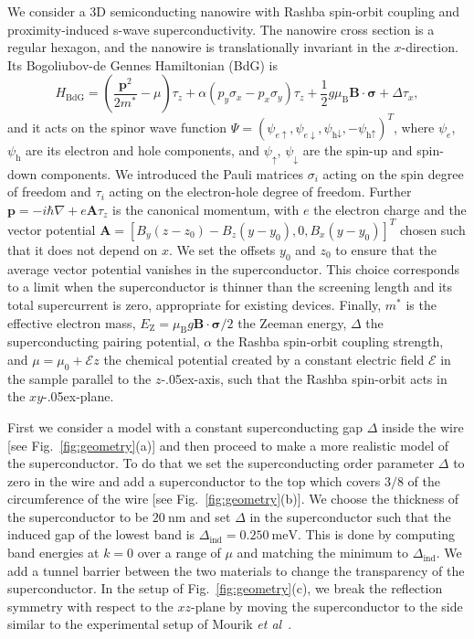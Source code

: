 We consider a 3D semiconducting nanowire with Rashba spin-orbit coupling and proximity-induced s-wave superconductivity.
The nanowire cross section is a regular hexagon, and the nanowire is translationally invariant in the $x$-direction.
Its Bogoliubov-de Gennes Hamiltonian (BdG) is
\begin{equation}
H_\textrm{BdG} = \left(\frac{\mathbf{p}^{2}}{2m^*}-\mu\right)\tau_z+\alpha\left(p_{y}\sigma_x -p_{x}\sigma_y \right)\tau_z + \frac{1}{2}g\mu_\textrm{B}\mathbf{B}\cdot\boldsymbol{\sigma}+\Delta\tau_x,\label{eq:H_BdG}
\end{equation}
and it acts on the spinor wave function $\Psi={\left(\psi_{e\uparrow},\psi_{e\downarrow},\psi_{\textrm{h}\downarrow},-\psi_{\textrm{h}\uparrow}\right)}^{T}$, where $\psi_e$, $\psi_\textrm{h}$ are its electron and hole components, and $\psi_\uparrow$, $\psi_\downarrow$ are the spin-up and spin-down components.
We introduced the Pauli matrices $\sigma_{i}$ acting on the spin degree of freedom and $\tau_{i}$ acting on the electron-hole degree of freedom.
Further $\mathbf{p}=-i\hbar\nabla+e\mathbf{A}\tau_z$ is the canonical momentum, with $e$ the electron charge and the vector potential $\mathbf{A}={\left[ B_y (z - z_0) - B_z (y - y_0), 0, B_x (y - y_0)\right]}^{T}$ chosen such that it does not depend on $x$.
We set the offsets $y_0$ and $z_0$ to ensure that the average vector potential vanishes in the superconductor.
This choice corresponds to a limit when the superconductor is thinner than the screening length and its total supercurrent is zero, appropriate for existing devices.
Finally, $m^*$ is the effective electron mass, $E_\textrm{Z}=\mu_\textrm{B}g\mathbf{B}\cdot\boldsymbol{\sigma}/2$ the Zeeman energy,  $\Delta$ the superconducting pairing potential, $\alpha$ the Rashba spin-orbit coupling strength, and $\mu=\mu_0+\mathcal{E} z$ the chemical potential created by a constant electric field $\mathcal{E}$ in the sample parallel to the $z$\kern-.05ex-axis, such that the Rashba spin-orbit acts in the $xy$\kern-.05ex-plane.


First we consider a model with a constant superconducting gap $\Delta$ inside the wire [see Fig.~\ref{fig:geometry}(a)] and then proceed to make a more realistic model of the superconductor.
To do that we set the superconducting order parameter $\Delta$ to zero in the wire and add a superconductor to the top which covers $3/8$ of the circumference of the wire [see Fig.~\ref{fig:geometry}(b)].
We choose the thickness of the superconductor to be $\SI{20}{\nano\metre}$ and set $\Delta$ in the superconductor such that the induced gap of the lowest band is $\Delta_\textrm{ind}=\SI{0.250}{\milli\electronvolt}$.
This is done by computing band energies at $k=0$ over a range of $\mu$ and matching the minimum to $\Delta_\textrm{ind}$.
We add a tunnel barrier between the two materials to change the transparency of the superconductor.
In the setup of Fig.~\ref{fig:geometry}(c), we break the reflection symmetry with respect to the $xz$-plane by moving the superconductor to the side similar to the experimental setup of Mourik \emph{et al}~\cite{Mourik2012}.

